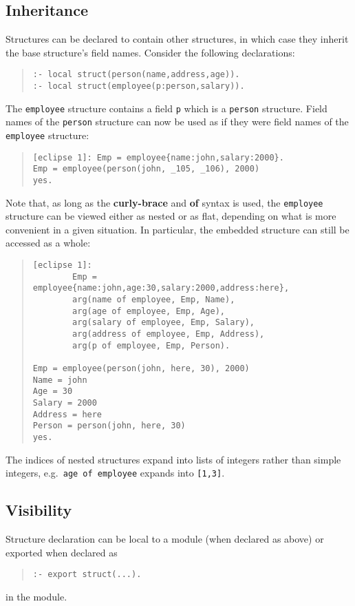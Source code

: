 \subsection{Inheritance}
Structures can be declared to contain other structures,
in which case they inherit the base structure's field names.
Consider the following declarations:
\begin{quote}\begin{verbatim}
:- local struct(person(name,address,age)).
:- local struct(employee(p:person,salary)).
\end{verbatim}\end{quote}
The \verb+employee+ structure contains a field \verb+p+ which is a
\verb+person+ structure.
Field names of the \verb+person+ structure can now be used as if
they were field names of the \verb+employee+ structure:
\begin{quote}\begin{verbatim}
[eclipse 1]: Emp = employee{name:john,salary:2000}.
Emp = employee(person(john, _105, _106), 2000)
yes.
\end{verbatim}\end{quote}
Note that, as long as the {\bf curly-brace} and {\bf of} syntax is used,
the \verb+employee+ structure can be viewed either as nested or as flat,
depending on what is more convenient in a given situation.
In particular, the embedded structure can still be accessed as a whole:
\begin{quote}\begin{verbatim}
[eclipse 1]:
        Emp = employee{name:john,age:30,salary:2000,address:here},
        arg(name of employee, Emp, Name),
        arg(age of employee, Emp, Age),
        arg(salary of employee, Emp, Salary),
        arg(address of employee, Emp, Address),
        arg(p of employee, Emp, Person).
        
Emp = employee(person(john, here, 30), 2000)
Name = john
Age = 30
Salary = 2000
Address = here
Person = person(john, here, 30)
yes.
\end{verbatim}\end{quote}
The indices of nested structures expand into
lists of integers rather than simple integers,
e.g.\ \verb+age of employee+ expands into \verb+[1,3]+.


\subsection{Visibility}
Structure declaration can be local to a module (when declared as above)
or exported when declared as
\begin{quote}\begin{verbatim}
:- export struct(...).
\end{verbatim}\end{quote}
in the module.


